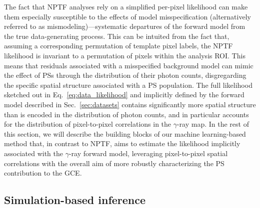 \documentclass[prd,aps,10pt,nofootinbib,twocolumn,superscriptaddress,preprintnumbers,balancelastpage,longbibliography]{revtex4-1}
\begin{document}
The fact that NPTF analyses rely on a simplified per-pixel likelihood can make them especially susceptible to the effects of model misspecification (alternatively referred to as mismodeling)---systematic departures of the forward model from the true data-generating process. This can be intuited from the fact that, assuming a corresponding permutation of template pixel labels, the NPTF likelihood is invariant to a permutation of pixels within the analysis ROI. This means that residuals associated with a misspecified background model can mimic the effect of PSs through the distribution of their photon counts, disgregarding the specific spatial structure associated with a PS population. The full likelihood sketched out in Eq.~\eqref{eq:data_likelihood} and implicitly defined by the forward model described in Sec.~\ref{sec:datasets} contains significantly more spatial structure than is encoded in the distribution of photon counts, and in particular accounts for the distribution of pixel-to-pixel correlations in the $\gamma$-ray map.  
In the rest of this section, we will describe the building blocks of our machine learning-based method that, in contrast to NPTF, aims to estimate the likelihood implicitly associated with the $\gamma$-ray forward model, leveraging pixel-to-pixel spatial correlations with the overall aim of more robustly characterizing the PS contribution to the GCE.  %


\subsection{Simulation-based inference}

\end{document}
